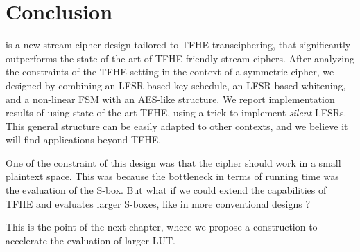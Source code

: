 \section{Conclusion}
\label{sec:conclusion}


\coolName{} is a new stream cipher design tailored to TFHE
transciphering, that significantly outperforms the state-of-the-art of
TFHE-friendly stream ciphers.  After analyzing the constraints of the
TFHE setting in the context of a symmetric cipher, we designed
\coolName{} by combining an LFSR-based key schedule, an LFSR-based
whitening, and a non-linear FSM with an AES-like structure.  We report
implementation results of \coolName{} using state-of-the-art TFHE, using
a trick to implement \emph{silent} LFSRs.  This general structure can be
easily adapted to other contexts, and we believe it will find
applications beyond TFHE.


One of the constraint of this design was that the cipher should work in a small plaintext space. This was because the bottleneck in terms of running time was the evaluation of the S-box. But what if we could extend the capabilities of TFHE and evaluates larger S-boxes, like in more conventional designs ?

This is the point of the next chapter, where we propose a construction to accelerate the evaluation of larger LUT.

